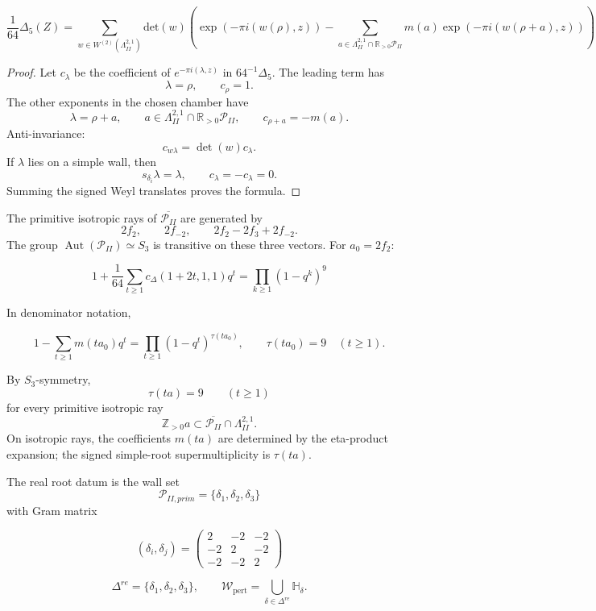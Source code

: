 \documentclass[11pt]{memoir}
\newcommand{\Z}{\mathbb{Z}} \newcommand{\C}{\mathbb{C}}
\newcommand{\R}{\mathbb{R}} \newcommand{\La}{\Lambda}
\newcommand{\Hpl}{\mathbb{H}}
\newcommand{\Poly}{\mathcal{P}}
\newcommand{\Aut}{\operatorname{Aut}}
\begin{document}
\begin{lemma}
$$\frac{1}{64}\Delta_5(Z)
=\displaystyle\sum_{w \in W^{(2)}(\La^{2,1}_{II})} \text{det}(w)( \exp(-\pi
i(w(\rho),z))- \sum_{a \in \La^{2,1}_{II}\cap\R_{>0}\Poly_{II}}
m(a)\exp(-\pi i(w(\rho+a),z)))$$
\end{lemma}

\begin{proof}
Let $c_\lambda$ be the coefficient of $e^{-\pi i(\lambda,z)}$ in
$64^{-1}\Delta_5$.  The leading term has
$$\lambda=\rho,\qquad c_\rho=1.$$
The other exponents in the chosen chamber have
$$\lambda=\rho+a,\qquad
a\in\La^{2,1}_{II}\cap\R_{>0}\Poly_{II},\qquad
c_{\rho+a}=-m(a).$$
Anti-invariance:
$$c_{w\lambda}=\det(w)c_\lambda.$$
If $\lambda$ lies on a simple wall, then
$$s_{\delta_i}\lambda=\lambda,\qquad c_\lambda=-c_\lambda=0.$$
Summing the signed Weyl translates proves the formula.
\end{proof}

The primitive isotropic rays of $\overline{\Poly_{II}}$ are generated by
$$2f_2,\qquad 2f_{-2},\qquad 2f_2-2f_3+2f_{-2}.$$
The group $\Aut(\Poly_{II})\simeq S_3$ is transitive on these three
vectors.  For $a_0=2f_2$:

$$1 + \frac{1}{64} \sum_{t \geq 1} c_\Delta(1 + 2t, 1, 1)q^t = \displaystyle\prod_{k\geq 1} (1
- q^k)^9$$

In denominator notation,

$$ 1 - \sum_{t \geq 1} m(t a_0) q^t = \displaystyle\prod_{t\geq 1}
(1 - q^t)^{\tau(t a_0)},\qquad \tau(t a_0)=9\quad(t\geq1).$$

By $S_3$-symmetry,
$$\tau(ta)=9\qquad(t\geq1)$$
for every primitive isotropic ray
$$\Z_{>0}a\subset
\overline{\Poly_{II}}\cap\La^{2,1}_{II}.$$
On isotropic rays, the coefficients $m(ta)$ are determined by the
eta-product expansion; the signed simple-root supermultiplicity is
\(\tau(ta)\).


The real root datum is the wall set
$$\Poly_{II,prim}=\{\delta_1,\delta_2,\delta_3\}$$
with Gram matrix

$$(\delta_i,\delta_j) = \begin{pmatrix}2 & -2 & -2\\-2 & 2 & -2\\-2 & -2 & 2\end{pmatrix}$$

\begin{definition}
$$\Delta^{re}=\{\delta_1,\delta_2,\delta_3\},\qquad
\mathcal W_{\mathrm{pert}}
=\bigcup_{\delta\in\Delta^{re}}\Hpl_\delta.$$
\end{definition}
\end{document}
